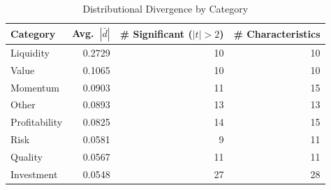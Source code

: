 \begin{table}
\caption{Distributional Divergence by Category}
\label{tab:divergence_by_category}
\begin{tabular}{lrrr}
\toprule
Category & Avg.\ $|\bar{d}|$ & \# Significant ($|t|>2$) & \# Characteristics \\
\midrule
Liquidity & 0.2729 & 10 & 10 \\
Value & 0.1065 & 10 & 10 \\
Momentum & 0.0903 & 11 & 15 \\
Other & 0.0893 & 13 & 13 \\
Profitability & 0.0825 & 14 & 15 \\
Risk & 0.0581 & 9 & 11 \\
Quality & 0.0567 & 11 & 11 \\
Investment & 0.0548 & 27 & 28 \\
\bottomrule
\end{tabular}
\end{table}
